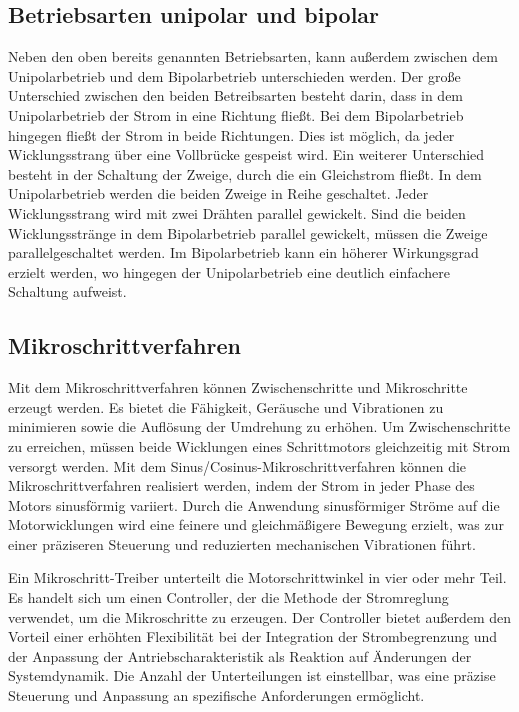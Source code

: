\subsection{Betriebsarten unipolar und bipolar}

Neben den oben bereits genannten Betriebsarten, kann außerdem zwischen dem Unipolarbetrieb und dem Bipolarbetrieb unterschieden werden. Der große Unterschied zwischen den beiden Betreibsarten besteht darin, dass in dem Unipolarbetrieb der Strom in eine Richtung fließt. Bei dem Bipolarbetrieb hingegen fließt der Strom in beide Richtungen. Dies ist möglich, da jeder Wicklungsstrang über eine Vollbrücke gespeist wird. Ein weiterer Unterschied besteht in der Schaltung der Zweige, durch die ein Gleichstrom fließt. In dem Unipolarbetrieb werden die beiden Zweige in Reihe geschaltet. Jeder Wicklungsstrang wird mit zwei Drähten parallel gewickelt. Sind die beiden Wicklungsstränge in dem Bipolarbetrieb parallel gewickelt, müssen die Zweige parallelgeschaltet werden. Im Bipolarbetrieb kann ein höherer Wirkungsgrad erzielt werden, wo hingegen der Unipolarbetrieb eine deutlich einfachere Schaltung aufweist. \cite{Schroder.2021}

\subsection{Mikroschrittverfahren}

Mit dem Mikroschrittverfahren können Zwischenschritte und Mikroschritte erzeugt werden. Es bietet die Fähigkeit, Geräusche und Vibrationen zu minimieren sowie die Auflösung der Umdrehung zu erhöhen. Um Zwischenschritte zu erreichen, müssen beide Wicklungen eines Schrittmotors gleichzeitig mit Strom versorgt werden. 
Mit dem Sinus/Cosinus-Mikroschrittverfahren können die Mikroschrittverfahren realisiert werden, indem der Strom in jeder Phase des Motors sinusförmig variiert. Durch die Anwendung sinusförmiger Ströme auf die Motorwicklungen wird eine feinere und gleichmäßigere Bewegung erzielt, was zur einer präziseren Steuerung und reduzierten mechanischen Vibrationen führt.\cite{MarcMcComb.2024}
  
Ein Mikroschritt-Treiber unterteilt die Motorschrittwinkel in vier oder mehr Teil. Es handelt sich um einen Controller, der die Methode der Stromreglung verwendet, um die Mikroschritte zu erzeugen. Der Controller bietet außerdem den Vorteil einer erhöhten Flexibilität bei der Integration der Strombegrenzung und der Anpassung der Antriebscharakteristik als Reaktion auf Änderungen der Systemdynamik. Die Anzahl der Unterteilungen ist einstellbar, was eine präzise Steuerung und Anpassung an spezifische Anforderungen ermöglicht.\cite{Babiel.2023}

